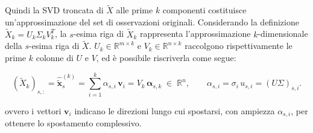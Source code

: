 \documentclass[11pt,a4paper]{article}
\theoremstyle{plain}
\theoremstyle{definition}
\theoremstyle{remark}
\begin{document}
Quindi la SVD troncata di $\tilde X$ alle
prime $k$ componenti costituisce un'approssimazione del set di osservazioni originali. Considerando la definizione
$\tilde{X}_k = U_k \Sigma_k V_k^T$, la $s$-esima riga di $\tilde{X}_k$ rappresenta l'approssimazione $k$-dimensionale della $s$-esima riga di $\tilde{X}$.
$U_k \in \mathbb{R}^{m \times k}$ e $V_k \in \mathbb{R}^{n \times k}$ raccolgono
rispettivamente le prime $k$ colonne di $U$ e $V$, ed è possibile riscriverla
come segue:

\begin{equation}
  (\tilde{X}_k)_{s,:} = \hat{\tilde{\mathbf{x}}}_s^{(k)}
  = \sum_{i=1}^{k} \alpha_{s,i}\,\mathbf{v}_i
  = V_k\,\boldsymbol{\alpha}_{s,k}
  \;\in\; \mathbb{R}^n,
  \qquad
  \alpha_{s,i} = \sigma_i\,u_{s,i} = (U\Sigma)_{s,i}.
  \label{eq:ric_mese_centrata}
\end{equation}

ovvero i vettori $\mathbf{v}_i$ indicano le direzioni lungo cui spostarsi, con
ampiezza $\alpha_{s,i}$, per ottenere lo spostamento complessivo.

\end{document}
